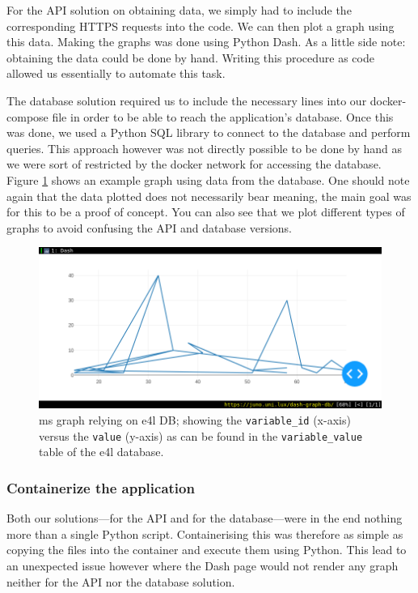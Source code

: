 For the API solution on obtaining data, we simply had to include the
corresponding HTTPS requests into the code. We can then plot a graph
using this data. Making the graphs was done using Python Dash. As a
little side note: obtaining the data could be done by hand.
Writing this procedure as code allowed us essentially to automate this
task.

The database solution required us to include the necessary lines into
our docker-compose file in order to be able to reach the application's
database. Once this was done, we used a Python SQL library to connect to
the database and perform queries. This approach however was not
directly possible to be done by hand as we were sort of restricted by
the docker network for accessing the database. Figure
\ref{fig:dash-db} shows an example graph using data from the
database. One should note again that the data plotted does not
necessarily bear meaning, the main goal was for this to be a proof of
concept. You can also see that we plot different types of graphs to
avoid confusing the API and database versions.

\begin{figure}
	\centering
	\includegraphics[width=\linewidth]{images/dash-DB-demo.png}
	\caption{\gls{ms} graph relying on \gls{e4l} DB; showing the
		\texttt{variable\_id} (x-axis) versus the \texttt{value} (y-axis) as
		can be found in the \texttt{variable\_value} table of the \gls{e4l}
		database.}
	\label{fig:dash-db}
\end{figure}

\subsubsection{Containerize the application}

Both our solutions---for the API and for the database---were in the
end nothing more than a single Python script. Containerising this was
therefore as simple as copying the files into the container and
execute them using Python. This lead to an unexpected issue however
where the Dash page would not render any graph neither for the API nor
the database solution.


